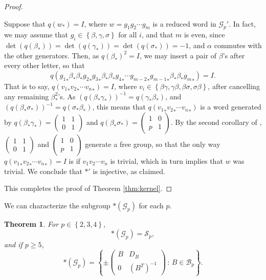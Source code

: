 \documentclass{amsart}     %
\newcommand{\set}[1]{ \left\{ #1 \right\} }
\newtheorem{thm}{Theorem}[section]    %
\theoremstyle{definition}
\begin{document}
\begin{proof}
\begin{description}
Suppose that $q(w_*) = I$, where $w = g_1 g_2 \cdots g_m$ is a reduced word in $\mathcal{G}_p'$. In fact, we may assume that $g_i \in \set{\beta, \gamma, \sigma}$ for all $i$, and that $m$ is even, since $\det(q(\beta_*)) = \det(q(\gamma_*)) = \det(q(\sigma_*)) = -1$, and $\alpha$ commutes with the other generators. Then, as $q(\beta_*)^2 = I$, we may insert a pair of $\beta$'s after every other letter, so that \[q({g_1}_* \beta_* \beta_* {g_2}_* {g_3}_* \beta_* \beta_* {g_4}_* \cdots {g_{m-2}}_* {g_{m-1}}_* \beta_* \beta_* {g_{m}}_* ) = I.\] That is to say, $q({v_1}_* {v_2}_* \cdots {v_n}_*) = I$, where $v_i \in \set{ \beta \gamma, \gamma \beta, \beta \sigma, \sigma \beta}$, after cancelling any remaining $\beta_*^2$'s. As $\left(q(\beta_* \gamma_*)\right)^{-1} = q(\gamma_* \beta_*)$, and $\left(q(\beta_* \sigma_*)\right)^{-1} = q(\sigma_* \beta_*)$, this means that $q({v_1}_* {v_2}_* \cdots {v_n}_*)$ is a word generated by $q(\beta_* \gamma_*) = \begin{pmatrix} 1 & 1 \\ 0 & 1 \end{pmatrix}$ and $q(\beta_* \sigma_*) = \begin{pmatrix} 1 & 0 \\ p & 1 \end{pmatrix}$. By the second corollary of \cite{LynUllPR2x2MGFP}, $\begin{pmatrix} 1 & 1 \\ 0 & 1 \end{pmatrix}$ and $\begin{pmatrix} 1 & 0 \\ p & 1 \end{pmatrix}$ generate a free group, so that the only way $q({v_1}_* {v_2}_* \cdots {v_n}_*) = I$ is if $v_1 v_2 \cdots v_n$ is trivial, which in turn implies that $w$ was trivial. We conclude that $*'$ is injective, as claimed. 

\end{description}

This completes the proof of Theorem \ref{thm:kernel}.
\end{proof}



We can characterize the subgroup $*(\mathcal{G}_p)$ for each $p$.

\begin{thm} \label{thm:preciseimages} For $p \in \set{2, 3, 4}$, \[*(\mathcal{G}_p) = \mathcal{S}_p,\] and if $p \geq 5$, \[*(\mathcal{G}_p) = \set{ \pm \begin{pmatrix} B & D_B \\ 0 & (B^T)^{-1} \end{pmatrix} \, : \, B \in \mathcal{B}_p }.\]
\end{thm}
\end{document}
